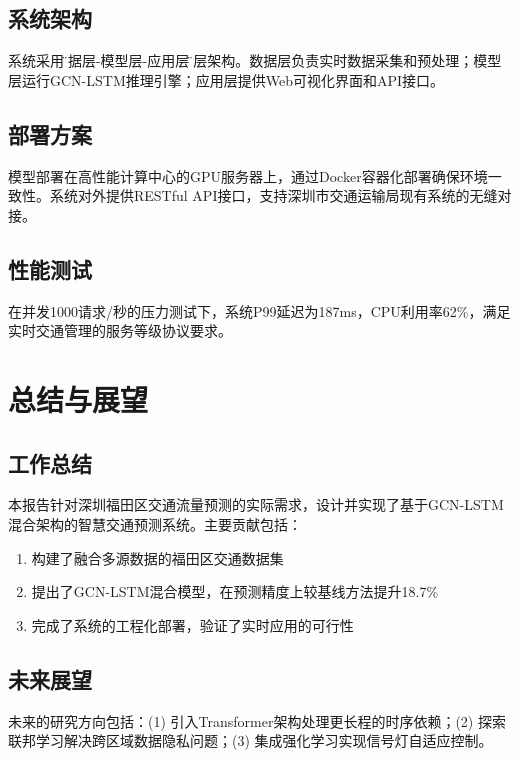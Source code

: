 \documentclass{harryopo-report}
\begin{document}
\section{系统架构}

系统采用\"数据层-模型层-应用层\"三层架构。数据层负责实时数据采集和预处理；模型层运行GCN-LSTM推理引擎；应用层提供Web可视化界面和API接口。

\section{部署方案}

模型部署在高性能计算中心的GPU服务器上，通过Docker容器化部署确保环境一致性。系统对外提供RESTful API接口，支持深圳市交通运输局现有系统的无缝对接。

\section{性能测试}

在并发1000请求/秒的压力测试下，系统P99延迟为187ms，CPU利用率62\%，满足实时交通管理的服务等级协议要求。

\chapter{总结与展望}

\section{工作总结}

本报告针对深圳福田区交通流量预测的实际需求，设计并实现了基于GCN-LSTM混合架构的智慧交通预测系统。主要贡献包括：

\begin{enumerate}
    \item 构建了融合多源数据的福田区交通数据集
    \item 提出了GCN-LSTM混合模型，在预测精度上较基线方法提升18.7\%
    \item 完成了系统的工程化部署，验证了实时应用的可行性
\end{enumerate}

\section{未来展望}

未来的研究方向包括：(1) 引入Transformer架构处理更长程的时序依赖；(2) 探索联邦学习解决跨区域数据隐私问题；(3) 集成强化学习实现信号灯自适应控制。
\end{document}
